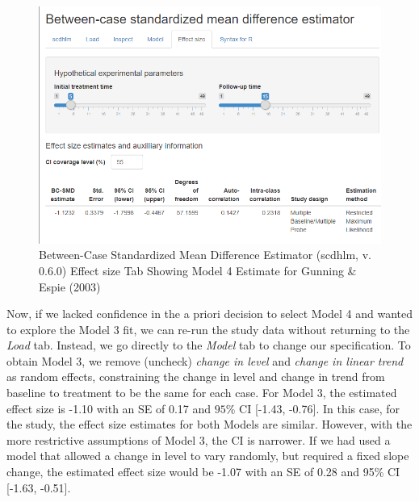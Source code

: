 \documentclass[
]{book}
\begin{document}
\begin{figure}
\includegraphics[width=0.75\linewidth]{images/app.ES.model4_GunningEspie2003} \caption{Between-Case Standardized Mean Difference Estimator (scdhlm, v. 0.6.0) Effect size Tab Showing Model 4 Estimate for Gunning \& Espie (2003)}\label{fig:Gunning-2003-ES}
\end{figure}

Now, if we lacked confidence in the a priori decision to select Model 4 and wanted to explore the Model 3 fit, we can re-run the study data without returning to the \emph{Load} tab. Instead, we go directly to the \emph{Model} tab to change our specification. To obtain Model 3, we remove (uncheck) \emph{change in level} and \emph{change in linear trend} as random effects, constraining the change in level and change in trend from baseline to treatment to be the same for each case. For Model 3, the estimated effect size is -1.10 with an SE of 0.17 and \(95\%\) CI {[}-1.43, -0.76{]}. In this case, for the \citet{gunning2003Psychological} study, the effect size estimates for both Models are similar. However, with the more restrictive assumptions of Model 3, the CI is narrower. If we had used a model that allowed a change in level to vary randomly, but required a fixed slope change, the estimated effect size would be -1.07 with an SE of 0.28 and 95\% CI {[}-1.63, -0.51{]}.
\end{document}
